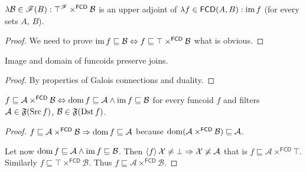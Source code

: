 \begin{lem}
$\lambda\mathcal{B}\in\mathscr{F}(B):\top^{\mathscr{F}}\times^{\mathsf{FCD}}
\mathcal{B}$
is an upper adjoint of $\lambda f\in\mathsf{FCD}(A,B):\operatorname{im} f$ (for
every sets $A$, $B$).\end{lem}
\begin{proof}
We need to prove $\operatorname{im} f\sqsubseteq\mathcal{B}\Leftrightarrow
f\sqsubseteq\top\times^{\mathsf{FCD}}\mathcal{B}$
what is obvious.\end{proof}
\begin{cor}
\label{fcd-dom-join}Image and domain of funcoids preserve joins.\end{cor}
\begin{proof}
By properties of Galois connections and duality.\end{proof}
\begin{prop}
$f\sqsubseteq\mathcal{A}\times^{\mathsf{FCD}}\mathcal{B}\Leftrightarrow\operatorname{dom}
f\sqsubseteq\mathcal{A}\wedge\operatorname{im} f\sqsubseteq\mathcal{B}$
for every funcoid $f$ and filters $\mathcal{A}\in\mathfrak{F}(\operatorname{Src} f)$,
$\mathcal{B}\in\mathfrak{F}(\operatorname{Dst} f)$.\end{prop}
\begin{proof}
$f\sqsubseteq\mathcal{A}\times^{\mathsf{FCD}}\mathcal{B}\Rightarrow\operatorname{dom}
f\sqsubseteq\mathcal{A}$
because
$\operatorname{dom}(\mathcal{A}\times^{\mathsf{FCD}}\mathcal{B})\sqsubseteq\mathcal{A}$.

Let now $\operatorname{dom} f\sqsubseteq\mathcal{A}\wedge\operatorname{im} f\sqsubseteq\mathcal{B}$.
Then $\left\langle f\right\rangle\mathcal{X}\neq\bot\Rightarrow\mathcal{X}\not\asymp\mathcal{A}$
that is $f\sqsubseteq\mathcal{A}\times^{\mathsf{FCD}}\top$. Similarly
$f\sqsubseteq\top\times^{\mathsf{FCD}}\mathcal{B}$. Thus
$f\sqsubseteq\mathcal{A}\times^{\mathsf{FCD}}\mathcal{B}$.
\end{proof}


